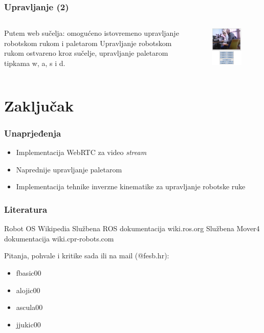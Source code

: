 \documentclass{beamer}
\begin{document}
\begin{frame}
    \frametitle{Upravljanje (2)}
    \begin{columns}
        Putem web sučelja:
        \newline omogućeno istovremeno upravljanje robotskom rukom i paletarom
        \newline\newline Upravljanje robotskom rukom ostvareno kroz sučelje, upravljanje paletarom tipkama w, a, s i d.
        \begin{figure}[h!]
            \centering
            \includegraphics[width=50mm]{web.png}
        \end{figure}
    \end{columns}
\end{frame}

\section{Zaključak}

\begin{frame}
    \frametitle{Unaprjeđenja}
    \begin{itemize}
        \item Implementacija WebRTC za video \emph{stream}
        \item Naprednije upravljanje paletarom
        \item Implementacija tehnike inverzne kinematike za upravljanje robotske ruke
    \end{itemize}
\end{frame}

\begin{frame}
    \frametitle{Literatura}
    
    \begin{thebibliography}{10}
        \beamertemplatearticlebibitems

            Robot OS
            \newblock Wikipedia
            Službena ROS dokumentacija
            \newblock wiki.ros.org
            Službena Mover4 dokumentacija
            \newblock wiki.cpr-robots.com
    \end{thebibliography}
\end{frame}

\begin{frame}
    Pitanja, pohvale i kritike sada ili na mail (@fesb.hr):\newline
    \begin{itemize}
        \item fbasic00
        \item alojic00
        \item ascula00
        \item jjukic00
    \end{itemize}
    
\end{frame}
\end{document}
